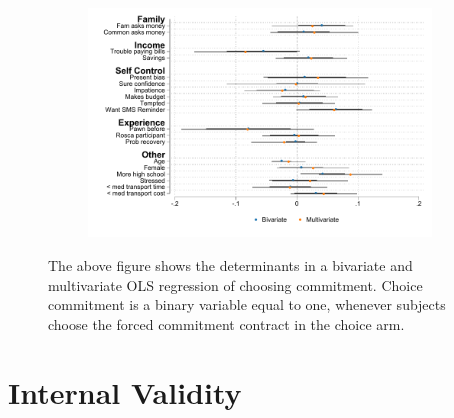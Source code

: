 \begin{appendix}
\begin{figure}[H]
    \caption{Determinants of choice.}
    \begin{center}
    \begin{subfigure}{0.65\textwidth}
        \centering
        \includegraphics[width=\textwidth]{Figuras/determinants_choose_commitment.pdf}
    \end{subfigure}
    \end{center}
\footnotesize{The above figure shows the determinants in a bivariate and multivariate OLS regression of choosing commitment. Choice commitment is a binary variable equal to one, whenever subjects choose the forced commitment contract in the choice arm. }
    \label{weekly_def_rates}
\end{figure}


\normalsize
\normalsize

\section{ Internal Validity}



\end{appendix}

